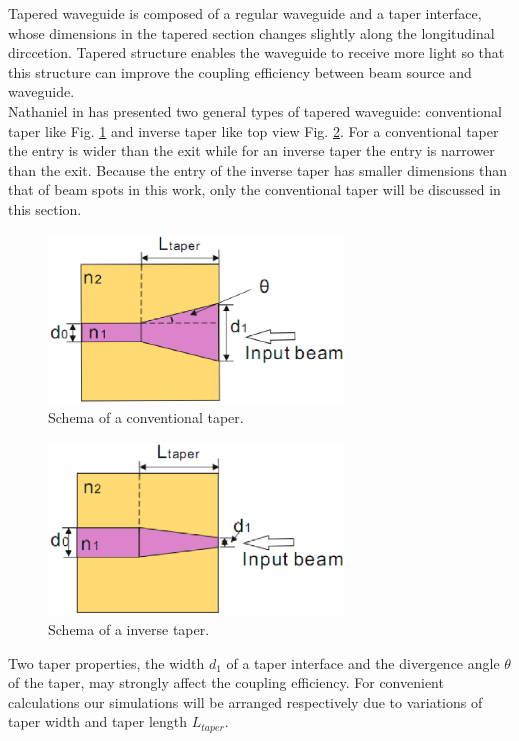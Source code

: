 Tapered waveguide is composed of a regular waveguide and a taper interface, whose dimensions in the tapered section changes slightly along the longitudinal dirccetion\cite{linear_tapered_waveguides}. Tapered structure enables the waveguide to receive more light so that this structure can improve the coupling efficiency between beam source and waveguide.\\  
Nathaniel in \cite{design_fabrication_tapered_waveguide} has presented two general types of tapered waveguide: conventional taper like Fig. \ref{fig:conventional_taper} and inverse taper like top view  Fig. \ref{fig:inverse_taper}. For a conventional taper the entry is wider than the exit while for an inverse taper the entry is narrower than the exit. Because the entry of the inverse taper has smaller dimensions than that of beam spots in this work, only the conventional taper will be discussed in this section.
\begin{figure}[!ht]
\centering
\includegraphics[width=0.7\textwidth]{bilder/convernational_taper}
\caption{Schema of a conventional taper.}
\label{fig:conventional_taper}
\end{figure}
\begin{figure}[!ht]
\centering
\includegraphics[width=0.7\textwidth]{bilder/inverse_taper}
\caption{Schema of a inverse taper.}
\label{fig:inverse_taper}
\end{figure}

Two taper properties, the width $d_{1}$ of a taper interface and the divergence angle $\theta$ of the taper, may strongly affect the coupling efficiency. For convenient calculations our simulations will be arranged respectively due to variations of taper width and taper length $L_{taper}$.

